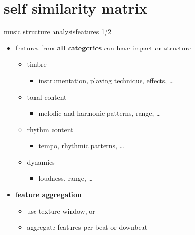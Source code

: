     \section[ssm]{self similarity matrix}
        \begin{frame}{music structure analysis}{features 1/2}
            \begin{itemize}
                \item   features from \textbf{all categories} can have impact on structure
                    \begin{itemize}
                        \item   timbre
                            \begin{itemize}
                                \item   instrumentation, playing technique, effects, \ldots
                            \end{itemize}
                        \item   tonal content
                            \begin{itemize}
                                \item   melodic and harmonic patterns, range, \ldots
                            \end{itemize}
                        \item   rhythm content
                            \begin{itemize}
                                \item   tempo, rhythmic patterns, \ldots
                            \end{itemize}
                        \item   dynamics
                            \begin{itemize}
                                \item   loudness, range, \ldots
                            \end{itemize}
                    \end{itemize}
               \bigskip
               \item<1->    \textbf{feature aggregation}
                \begin{itemize}
                    \item   use texture window, or
                    \item   aggregate features per beat or downbeat
                \end{itemize}
            \end{itemize}
        \end{frame}

